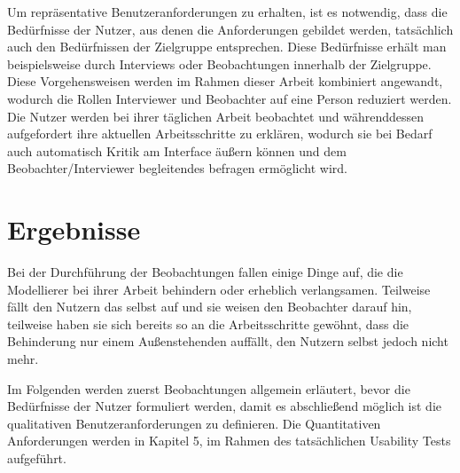 Um repräsentative Benutzeranforderungen zu erhalten, ist es notwendig, dass die Bedürfnisse der Nutzer, aus denen die Anforderungen gebildet werden, tatsächlich auch den Bedürfnissen der Zielgruppe entsprechen.
Diese Bedürfnisse erhält man beispielsweise durch Interviews oder Beobachtungen innerhalb der Zielgruppe.
Diese Vorgehensweisen werden im Rahmen dieser Arbeit kombiniert angewandt, wodurch die Rollen Interviewer und Beobachter auf eine Person reduziert werden.
Die Nutzer werden bei ihrer täglichen Arbeit beobachtet und währenddessen aufgefordert ihre aktuellen Arbeitsschritte zu erklären, wodurch sie bei Bedarf auch automatisch Kritik am Interface äußern können und dem Beobachter/Interviewer begleitendes befragen ermöglicht wird.

\section{Ergebnisse}

Bei der Durchführung der Beobachtungen fallen einige Dinge auf, die die Modellierer bei ihrer Arbeit behindern oder erheblich verlangsamen.
Teilweise fällt den Nutzern das selbst auf und sie weisen den Beobachter darauf hin, teilweise haben sie sich bereits so an die Arbeitsschritte gewöhnt, dass die Behinderung nur einem Außenstehenden auffällt, den Nutzern selbst jedoch nicht mehr.

Im Folgenden werden zuerst Beobachtungen allgemein erläutert, bevor die Bedürfnisse der Nutzer formuliert werden, damit es abschließend möglich ist die qualitativen Benutzeranforderungen zu definieren.
Die Quantitativen Anforderungen werden in Kapitel 5, im Rahmen des tatsächlichen Usability Tests aufgeführt.

